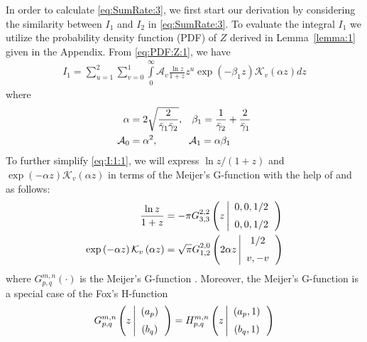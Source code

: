 \documentclass[conference]{IEEEtran}
\newcommand{\Bessel}[2]{\mathcal{K}_{{#1}}\left({#2}\right)}
\newcommand{\snravei}[1]{\bar\gamma_{#1}}
\begin{document}
%
%
In order to calculate \eqref{eq:SumRate:3}, we first start our
derivation by considering the similarity between $I_1$ and $I_2$ in
\eqref{eq:SumRate:3}. To evaluate the integral $I_1$ we utilize the
probability density function (PDF) of $Z$ derived in
Lemma~\ref{lemma:1} given in the Appendix. From \eqref{eq:PDF:Z:1},
we have
%
%
\begin{align} \label{eq:I:1:1}
    I_1
    =
    \sum\limits_{u=1}^{2}
    \sum\limits_{v=0}^{1}
    \int\limits_{0}^{\infty}
    \mathcal{A}_v
    \frac{\ln z}{1+z}  z^{u} \exp(-\beta_1 z)
    \Bessel{v}{ \alpha z}
    dz
\end{align}
%
%
where
%
%
\begin{align*}
    \alpha
    &=
    2\sqrt{\frac{2}{\snravei{1}\snravei{2}}},
    \hspace{0.3cm}
    \beta_1 = \frac{1}{\snravei{2}} + \frac{2}{\snravei{1}}
    \nonumber
    \\
    \mathcal{A}_0 &= \alpha^2,
    \hspace{1.1cm}
    \mathcal{A}_1 = \alpha \beta_1
\end{align*}
%
%
To further simplify \eqref{eq:I:1:1}, we will express $\ln z/(1+z)$
and $\exp\left(-\alpha z\right) \Bessel{v}{ \alpha z}$ in terms of
the Meijer's G-function with the help of
\cite[eq.~(8.4.6.13)]{Prudnikov:90:Book} and
\cite[eq.~(6.4.23.3)]{Prudnikov:90:Book} as follows:
%
%
\begin{align} \label{eq:ln:1}
    \frac{\ln z}{1 +z}
    &=
    -\pi
    G_{3,3}^{2,2}\left( {z} \left|{\begin{array}{*{20}c} {0,0,1/2}  \vspace{0.2cm}\\
    {0,0,1/2} \end{array}} \right.\right)
    \\ \label{eq:exp:1}
    \exp\left(-\alpha z\right) \Bessel{v}{ \alpha z}
    &=
    \sqrt{\pi}
    G_{1,2}^{2,0}\left({2\alpha z} \left|{\begin{array}{*{20}c} {1/2}  \vspace{0.2cm}\\
    {v,-v} \end{array}} \right. \right)
\end{align}
%
%
where $G_{p,q}^{m,n}(\cdot)$ is the Meijer's G-function
\cite[eq.~(8.2.1.1)]{Prudnikov:90:Book}. Moreover, the Meijer's
G-function is a special case of the Fox's H-function
\cite[eq.~(8.3.2.21)]{Prudnikov:90:Book}
%
%
\begin{align} \label{eq:Meijer:Fox:1}
    G_{p,q}^{m,n}\left( {z} \left|{\begin{array}{*{20}c} {(a_p)}  \vspace{0.2cm}\\
    {(b_q)} \end{array}} \right.\right)
    =
    H_{p,q}^{m,n}\left( {z} \left|{\begin{array}{*{20}c} {(a_p,1)}  \vspace{0.2cm}\\
    {(b_q,1)} \end{array}} \right.\right)
\end{align}
\end{document}

